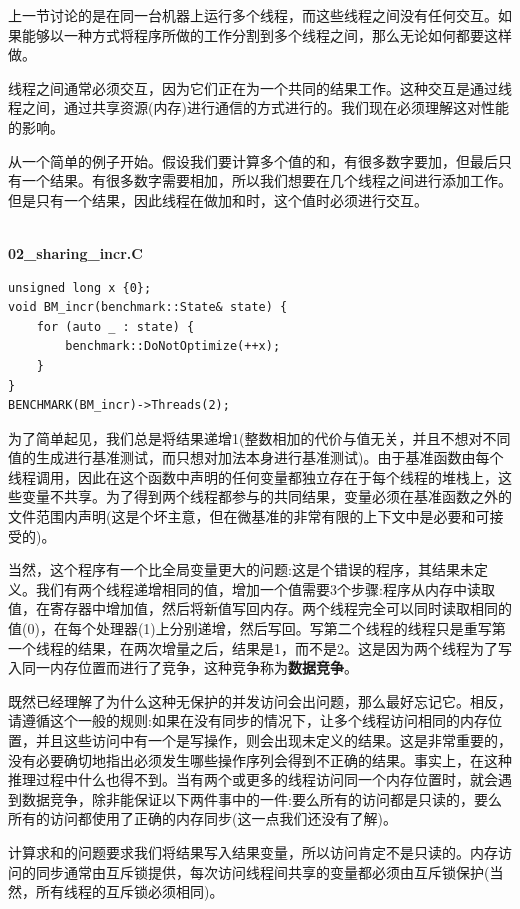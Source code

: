 上一节讨论的是在同一台机器上运行多个线程，而这些线程之间没有任何交互。如果能够以一种方式将程序所做的工作分割到多个线程之间，那么无论如何都要这样做。

线程之间通常必须交互，因为它们正在为一个共同的结果工作。这种交互是通过线程之间，通过共享资源(内存)进行通信的方式进行的。我们现在必须理解这对性能的影响。

从一个简单的例子开始。假设我们要计算多个值的和，有很多数字要加，但最后只有一个结果。有很多数字需要相加，所以我们想要在几个线程之间进行添加工作。但是只有一个结果，因此线程在做加和时，这个值时必须进行交互。

\hspace*{\fill} \\ %
\noindent
\textbf{02\_sharing\_incr.C}
\begin{lstlisting}[style=styleCXX]
unsigned long x {0};
void BM_incr(benchmark::State& state) {
	for (auto _ : state) {
		benchmark::DoNotOptimize(++x);
	}
}
BENCHMARK(BM_incr)->Threads(2);
\end{lstlisting}

为了简单起见，我们总是将结果递增1(整数相加的代价与值无关，并且不想对不同值的生成进行基准测试，而只想对加法本身进行基准测试)。由于基准函数由每个线程调用，因此在这个函数中声明的任何变量都独立存在于每个线程的堆栈上，这些变量不共享。为了得到两个线程都参与的共同结果，变量必须在基准函数之外的文件范围内声明(这是个坏主意，但在微基准的非常有限的上下文中是必要和可接受的)。

当然，这个程序有一个比全局变量更大的问题:这是个错误的程序，其结果未定义。我们有两个线程递增相同的值，增加一个值需要3个步骤:程序从内存中读取值，在寄存器中增加值，然后将新值写回内存。两个线程完全可以同时读取相同的值(0)，在每个处理器(1)上分别递增，然后写回。写第二个线程的线程只是重写第一个线程的结果，在两次增量之后，结果是1，而不是2。这是因为两个线程为了写入同一内存位置而进行了竞争，这种竞争称为\textbf{数据竞争}。

既然已经理解了为什么这种无保护的并发访问会出问题，那么最好忘记它。相反，请遵循这个一般的规则:如果在没有同步的情况下，让多个线程访问相同的内存位置，并且这些访问中有一个是写操作，则会出现未定义的结果。这是非常重要的，没有必要确切地指出必须发生哪些操作序列会得到不正确的结果。事实上，在这种推理过程中什么也得不到。当有两个或更多的线程访问同一个内存位置时，就会遇到数据竞争，除非能保证以下两件事中的一件:要么所有的访问都是只读的，要么所有的访问都使用了正确的内存同步(这一点我们还没有了解)。

计算求和的问题要求我们将结果写入结果变量，所以访问肯定不是只读的。内存访问的同步通常由互斥锁提供，每次访问线程间共享的变量都必须由互斥锁保护(当然，所有线程的互斥锁必须相同)。

